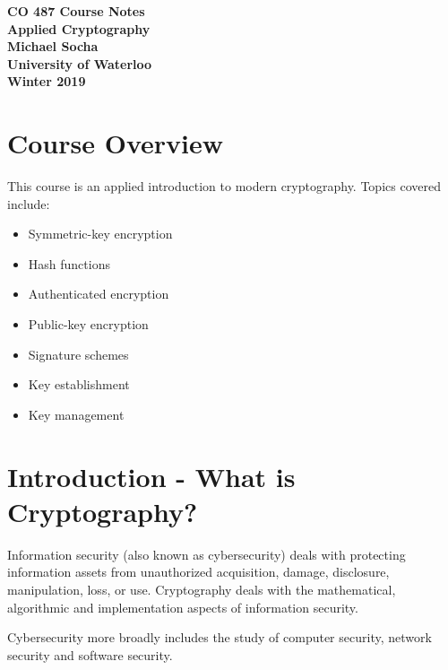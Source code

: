 \documentclass[12pt,titlepage]{article}
\let\stdsection\section
\renewcommand\section{\clearpage\stdsection}
\begin{document}
  \begin{titlepage}
    \vspace*{\fill}
    \centering

    \textbf{\Huge CO 487 Course Notes} \\ [0.4em]
    \textbf{\Large Applied Cryptography} \\ [1em]
    \textbf{\Large Michael Socha} \\ [1em]
    \textbf{\large University of Waterloo} \\
    \textbf{\large Winter 2019} \\
    \vspace*{\fill}
  \end{titlepage}

  \newpage 


  \tableofcontents

  \newpage


  \section{Course Overview}
    This course is an applied introduction to modern cryptography. Topics covered include:
    \begin{itemize}
      \item Symmetric-key encryption
      \item Hash functions
      \item Authenticated encryption
      \item Public-key encryption
      \item Signature schemes
      \item Key establishment
      \item Key management
    \end{itemize}

  \section{Introduction - What is Cryptography?}
    Information security (also known as cybersecurity) deals with protecting information assets from
    unauthorized acquisition, damage, disclosure, manipulation, loss, or use. Cryptography deals with
    the mathematical, algorithmic and implementation aspects of information security.

    Cybersecurity more broadly includes the study of computer security, network security and software
    security.
\end{document}
